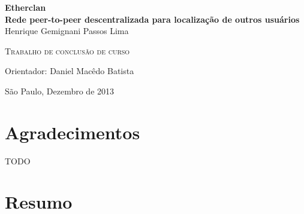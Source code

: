 \documentclass[11pt,twoside,a4paper]{book}
\begin{document}
\frontmatter 
\fancyhead[RO]{{\footnotesize\rightmark}\hspace{2em}\thepage}
\setcounter{tocdepth}{2}
\fancyhead[LE]{\thepage\hspace{2em}\footnotesize{\leftmark}}
\fancyhead[RE,LO]{}
\fancyhead[RO]{{\footnotesize\rightmark}\hspace{2em}\thepage}

\onehalfspacing  %

\thispagestyle{empty}
\begin{center}
    \vspace*{2.3cm}
    \textbf{
        {\LARGE Etherclan}\\
        \vspace*{0.5cm}
        {\Large Rede peer-to-peer descentralizada para localização de outros usuários
        }
    }\\
    
    \vspace*{1.2cm}
    \Large{Henrique Gemignani Passos Lima}
    
    \vskip 2cm
    \textsc{Trabalho de conclusão de curso} 
    
    \vskip 10cm
    Orientador: Daniel Macêdo Batista

   	\vskip 3cm
    
    \normalsize{São Paulo, Dezembro de 2013}
\end{center}


\chapter*{Agradecimentos}

TODO

\chapter*{Resumo}
\end{document}
